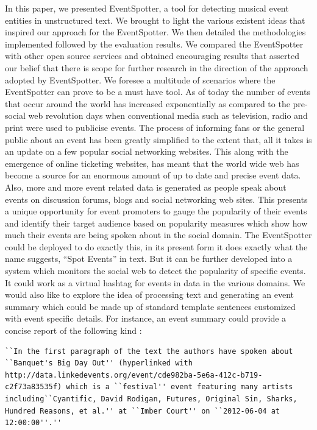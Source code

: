 \documentclass[a4paper,11pt]{report}
\begin{document}
In this paper, we presented EventSpotter, a tool for detecting musical event entities in unstructured text. We brought to light the various existent ideas that inspired our approach for the EventSpotter. We then detailed the methodologies implemented followed by the evaluation results. We compared the EventSpotter with other open source services and obtained encouraging results that asserted our belief that there is scope for further research in the direction of the approach adopted by EventSpotter.  We foresee a multitude of scenarios where the EventSpotter can prove to be a must have tool. As of today the number of events that occur around the world has increased exponentially as compared to the pre-social web revolution days when conventional media such as television, radio and print were used to publicise events. The process of informing fans or the general public about an event has been greatly simplified to the extent that, all it takes is an update on a few popular social networking websites. This along with the emergence of online ticketing websites, has meant that the world wide web has become a source for an enormous amount of up to date and precise event data. Also, more and more event related data is generated as people speak about events on discussion forums, blogs and social networking web sites. This presents a unique opportunity for event promoters to gauge the popularity of their events and identify their target audience based on popularity measures which show how much their events are being spoken about in the social domain. The EventSpotter could be deployed to do exactly this, in its present form it does exactly what the name suggests, ``Spot Events'' in text. But it can be further developed into a system which monitors the social web to detect the popularity of specific events. It could work as a virtual hashtag for events in data in the various domains. We would also like to explore the idea of processing text and generating an event summary which could be made up of standard template sentences customized with event specific details. For instance, an event summary could provide a concise report of the following kind : \newline

\begin{lstlisting}
``In the first paragraph of the text the authors have spoken about ``Banquet's Big Day Out'' (hyperlinked with http://data.linkedevents.org/event/cde982ba-5e6a-412c-b719-c2f73a83535f) which is a ``festival'' event featuring many artists including``Cyantific, David Rodigan, Futures, Original Sin, Sharks, Hundred Reasons, et al.'' at ``Imber Court'' on ``2012-06-04 at 12:00:00''.'' 
\end{lstlisting}
\end{document}
